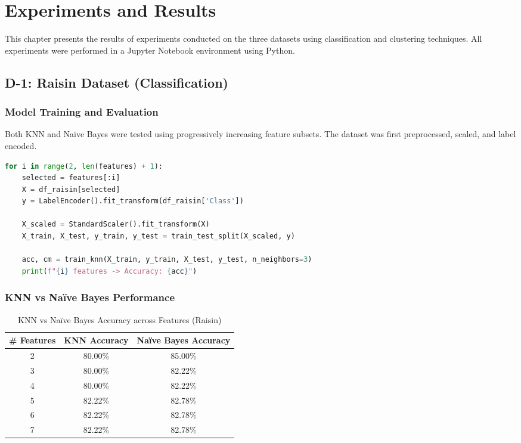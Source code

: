 \chapter{Experiments and Results}
\label{ch:experiments}

This chapter presents the results of experiments conducted on the three datasets using classification and clustering techniques. All experiments were performed in a Jupyter Notebook environment using Python.

\section{D-1: Raisin Dataset (Classification)}
\label{sec:results_raisin}

\subsection{Model Training and Evaluation}

Both KNN and Naïve Bayes were tested using progressively increasing feature subsets. The dataset was first preprocessed, scaled, and label encoded.

\begin{lstlisting}[language=Python, caption={Training KNN with increasing features}, label=list:raisin_knn]
for i in range(2, len(features) + 1):
    selected = features[:i]
    X = df_raisin[selected]
    y = LabelEncoder().fit_transform(df_raisin['Class'])

    X_scaled = StandardScaler().fit_transform(X)
    X_train, X_test, y_train, y_test = train_test_split(X_scaled, y)

    acc, cm = train_knn(X_train, y_train, X_test, y_test, n_neighbors=3)
    print(f"{i} features -> Accuracy: {acc}")
\end{lstlisting}

\subsection{KNN vs Naïve Bayes Performance}

\begin{table}[H]
\centering
\caption{KNN vs Naïve Bayes Accuracy across Features (Raisin)}
\label{tab:raisin_accuracy}
\begin{tabular}{|c|c|c|}
\hline
\# Features & KNN Accuracy & Naïve Bayes Accuracy \\
\hline
2 & 80.00\% & 85.00\% \\
3 & 80.00\% & 82.22\% \\
4 & 80.00\% & 82.22\% \\
5 & 82.22\% & 82.78\% \\
6 & 82.22\% & 82.78\% \\
7 & 82.22\% & 82.78\% \\
\hline
\end{tabular}
\end{table}

